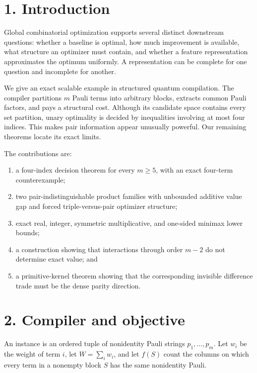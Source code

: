 \documentclass[
  11pt,
]{article}
\providecommand{\tightlist}{%
  \setlength{\itemsep}{0pt}\setlength{\parskip}{0pt}}
\begin{document}
\hypertarget{introduction}{%
\section{1. Introduction}\label{introduction}}

Global combinatorial optimization supports several distinct downstream
questions: whether a baseline is optimal, how much improvement is
available, what structure an optimizer must contain, and whether a
feature representation approximates the optimum uniformly. A
representation can be complete for one question and incomplete for
another.

We give an exact scalable example in structured quantum compilation. The
compiler partitions \(m\) Pauli terms into arbitrary blocks, extracts
common Pauli factors, and pays a structural cost. Although its candidate
space contains every set partition, unary optimality is decided by
inequalities involving at most four indices. This makes pair information
appear unusually powerful. Our remaining theorems locate its exact
limits.

The contributions are:

\begin{enumerate}
\def\labelenumi{\arabic{enumi}.}
\tightlist
\item
  a four-index decision theorem for every \(m\ge5\), with an exact
  four-term counterexample;
\item
  two pair-indistinguishable product families with unbounded additive
  value gap and forced triple-versus-pair optimizer structure;
\item
  exact real, integer, symmetric multiplicative, and one-sided minimax
  lower bounds;
\item
  a construction showing that interactions through order \(m-2\) do not
  determine exact value; and
\item
  a primitive-kernel theorem showing that the corresponding invisible
  difference trade must be the dense parity direction.
\end{enumerate}

\hypertarget{compiler-and-objective}{%
\section{2. Compiler and objective}\label{compiler-and-objective}}

An instance is an ordered tuple of nonidentity Pauli strings
\(p_1, \ldots, p_m\). Let \(w_i\) be the weight of term \(i\), let
\(W=\sum_iw_i\), and let \(f(S)\) count the columns on which every term
in a nonempty block \(S\) has the same nonidentity Pauli.
\end{document}
